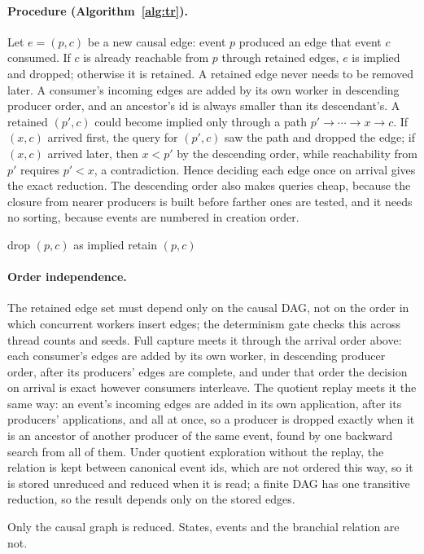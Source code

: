 \paragraph{Procedure (Algorithm~\ref{alg:tr}).}
Let $e = (p, c)$ be a new causal edge: event $p$ produced an edge that event $c$ consumed. If $c$ is
already reachable from $p$ through retained edges, $e$ is implied and dropped; otherwise it is
retained. A retained edge never needs to be removed later. A consumer's incoming edges are added by
its own worker in descending producer order, and an ancestor's id is always smaller than its
descendant's. A retained $(p', c)$ could become implied only through a path
$p' \rightarrow \cdots \rightarrow x \rightarrow c$. If $(x, c)$ arrived first, the query for
$(p', c)$ saw the path and dropped the edge; if $(x, c)$ arrived later, then $x < p'$ by the
descending order, while reachability from $p'$ requires $p' < x$, a contradiction. Hence deciding each
edge once on arrival gives the exact reduction. The descending order also makes queries cheap,
because the closure from nearer producers is built before farther ones are tested, and it needs no
sorting, because events are numbered in creation order.

\begin{algorithm}[htbp]
\caption{Online Transitive Reduction (insertion-only)}
\label{alg:tr}
\begin{algorithmic}[1]
            \State drop $(p, c)$ as implied
        \Else
            \State retain $(p, c)$
        \EndIf
    \EndFor
\EndProcedure
\end{algorithmic}
\end{algorithm}

\paragraph{Order independence.}
The retained edge set must depend only on the causal DAG, not on the order in which concurrent
workers insert edges; the determinism gate checks this across thread counts and seeds. Full capture
meets it through the arrival order above: each consumer's edges are added by its own worker, in
descending producer order, after its producers' edges are complete, and under that order the
decision on arrival is exact however consumers interleave. The quotient replay meets it the same
way: an event's incoming edges are added in its own application, after its producers' applications,
and all at once, so a producer is dropped exactly when it is an ancestor of another producer of the
same event, found by one backward search from all of them. Under quotient exploration without the
replay, the relation is kept between canonical event ids, which are not ordered this way, so it is
stored unreduced and reduced when it is read; a finite DAG has one transitive reduction, so the
result depends only on the stored edges.

Only the causal graph is reduced. States, events and the branchial relation are not.

